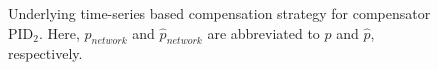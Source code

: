 \begin{figure}[htb]
\begin{tikzpicture}[node distance=2cm, shorten >= 1pt, >=stealth', auto, scale=0.9, transform shape]
\end{tikzpicture}
\caption{Underlying time-series based compensation strategy for compensator PID$_2$. Here, $p_{network}$ and $\hat{p}_{network}$ are abbreviated to $p$ and $\hat{p}$, respectively.}
\label{ch2:fig:power-transient-minimisation}
\end{figure}
